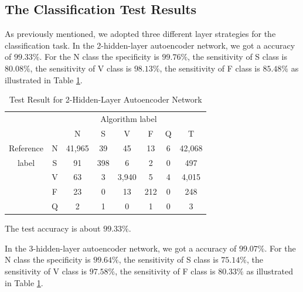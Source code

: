 \documentclass[journal]{IEEEtran}
\begin{document}
\subsection{The Classification Test Results}
As previously mentioned, we adopted three different layer strategies for the classification task. 
In the 2-hidden-layer autoencoder network, we got a accuracy of $99.33\%$. For the N class the specificity is $99.76\%$, the sensitivity of S class is $80.08\%$, the sensitivity of V class is $98.13\%$, the sensitivity of F class is $85.48\%$ as illustrated in Table \ref{table6}. 

\begin{table}[!htbp]
\begin{center}
\begin{threeparttable}
\caption{Test Result for 2-Hidden-Layer Autoencoder Network}
\label{table6}
\begin{tabular}{cccccccc}
\hline
\multicolumn{6}{r}{Algorithm label} \\
\cline{3-7}
			&   & N      & S    & V     & F   & Q   & T\\
\hline
 Reference  & N & 41,965 & 39   &  45   & 13  &  6  &  42,068 \\
	label   & S &  91    & 398  &  6    & 2   & 0   &  497\\
			& V &  63    & 3    & 3,940 & 5   & 4   &  4,015\\
			& F &  23    & 0    & 13    & 212 & 0   &  248\\
			& Q &  2     & 1    & 0      & 1   & 0   &  3\\
\hline
\end{tabular}
\begin{tablenotes}
\item The test accuracy is about $99.33\%$.
\end{tablenotes}
\end{threeparttable}
\end{center}
\end{table}

In the 3-hidden-layer autoencoder network, we got a accuracy of $99.07\%$. For the N class the specificity is $99.64\%$, the sensitivity of S class is $75.14\%$, the sensitivity of V class is $97.58\%$, the sensitivity of F class is $80.33\%$ as illustrated in Table \ref{table6}. 
\end{document}

